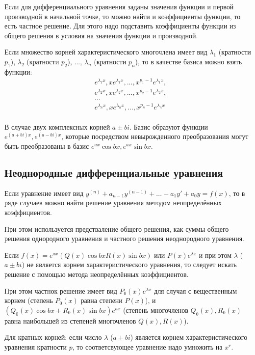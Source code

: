 \documentclass[12pt]{article}
\begin{document}
Если для дифференциального уравнения заданы значения функции и первой производной в начальной точке, то можно найти и коэффициенты функции, то есть частное решение. Для этого надо подставить коэффициенты функции из общего решения в условия на значения функции и производной.

Если множество корней характеристического многочлена имеет вид $\lambda_1$ (кратности $p_1$), $\lambda_2$ (кратности $p_2$), ..., $\lambda_n$ (кратности $p_n$), то в качестве базиса можно взять функции:
\begin{align*}
     & e^{\lambda_1 x}, xe^{\lambda_1 x}, ..., x^{p_1 - 1}e^{\lambda_1 x}, \\
     & e^{\lambda_2 x}, xe^{\lambda_2 x}, ..., x^{p_2 - 1}e^{\lambda_2 x}, \\
     & \dots                                                               \\
     & e^{\lambda_n x}, xe^{\lambda_n x}, ..., x^{p_n - 1}e^{\lambda_n x}  \\
\end{align*}

В случае двух комплексных корней $a \pm bi$. Базис образуют функции $e^{(a + bi)x}, e^{(a - bi)x}$, которые посредством невырожденного преобразования могут быть преобразованы в базис $e^{ax}\cos{bx}, e^{ax}\sin{bx}$.

\subsection{Неоднородные дифференциальные уравнения}
Если уравнение имеет вид $y^{(n)} + a_{n-1}y^{(n - 1)} + ... + a_1y' + a_0y = f(x)$, то в ряде случаев можно найти решение уравнения методом неопределённых коэффициентов.

При этом используется предстваление общего решения, как суммы общего решения однородного уравнения и частного решения неоднородного уравнения.

Если $f(x) = e^{ax}(Q(x)\cos{bx} R(x)\sin{bx})$ или $P(x)e^{\lambda x}$ и при этом $\lambda$ ($a \pm bi$) не является корнем характеристического уравнения, то следует искать решение с помощью метода неопределённых коэффициентов.

При этом частнок решение имеет вид $P_0(x)e^{\lambda x}$ для случая с вещественным корнем (степень $P_0(x)$ равна степени $P(x)$), и $(Q_0(x)\cos{bx} + R_0(x)\sin{bx})e^{ax}$ (степень многочленов $Q_0(x), R_0(x)$ равна наибольшей из степеней многочленов $Q(x), R(x)$).

Для кратных корней: если число $\lambda$ ($a \pm bi$) является корнем характеристического уравнения кратности $p$, то соответсвующее уравнение надо умножить на $x^{r}$.
\end{document}
